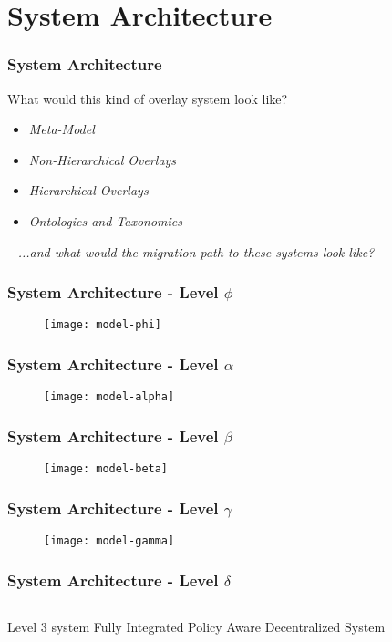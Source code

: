 \section{System Architecture}
\begin{frame}
\frametitle{System Architecture}
What would this kind of overlay system look like?
\begin{itemize}
\item<2-> \textit{Meta-Model}
\item<3-> \textit{Non-Hierarchical Overlays}
\item<4-> \textit{Hierarchical Overlays}
\item<5-> \textit{Ontologies and Taxonomies}
\end{itemize}
\
\newline
\newline
\pause
\textit{...and what would the migration path to these systems look like?}
\end{frame}

\begin{frame}[t]
\frametitle{System Architecture - Level $\phi$}
\begin{figure}[!t]
\centering
\texttt{[image: model-phi]}
\label{fig:model:phi}
\end{figure}
\end{frame}

\begin{frame}[t]
\frametitle{System Architecture - Level $\alpha$}
\begin{figure}[!t]
\centering
\texttt{[image: model-alpha]}
\label{fig:model:alpha}
\end{figure}
\end{frame}

\begin{frame}[t]
\frametitle{System Architecture - Level $\beta$}
\begin{figure}[!t]
\centering
\texttt{[image: model-beta]}
\label{fig:model:beta}
\end{figure}
\end{frame}

\begin{frame}[t]
\frametitle{System Architecture - Level $\gamma$}
\begin{figure}[!t]
\centering
\texttt{[image: model-gamma]}
\label{fig:model:gamma}
\end{figure}
\end{frame}

\begin{frame}[t]
\frametitle{System Architecture - Level $\delta$}
\begin{columns}[t]
Level 3 system 
Fully Integrated Policy Aware Decentralized System
\end{columns}
\end{frame}